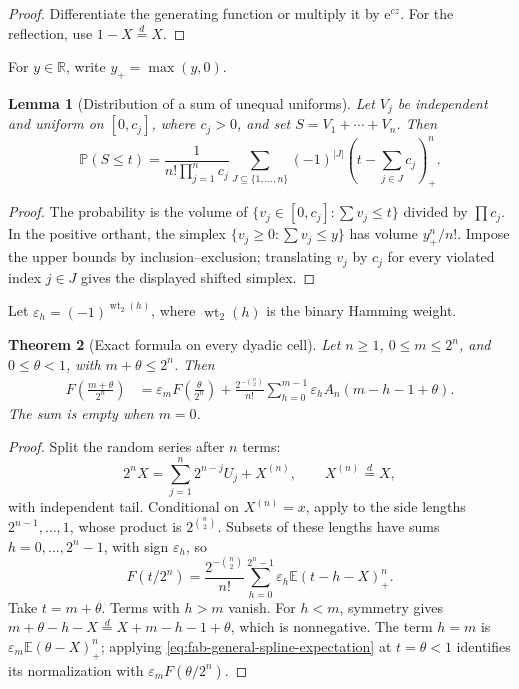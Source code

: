 \documentclass[11pt,oneside,openany]{book}
\newtheorem{theorem}{Theorem}[chapter]
\newtheorem{lemma}[theorem]{Lemma}
\theoremstyle{definition}
\theoremstyle{remark}
\newcommand{\R}{\mathbb R}
\newcommand{\e}{\mathrm e}
\newcommand{\E}{\mathbb E}
\newcommand{\Prob}{\mathbb P}
\begin{document}
\begin{proof}
Differentiate the generating function or multiply it by $\e^{cz}$.  For the
reflection, use $1-X\overset d=X$.
\end{proof}

For $y\in\R$, write $y_+=\max(y,0)$.

\begin{lemma}[Distribution of a sum of unequal uniforms]
\label{lem:fab-box-spline}
Let $V_j$ be independent and uniform on $[0,c_j]$, where $c_j>0$, and set
$S=V_1+\cdots+V_n$.  Then
\begin{equation}
 \Prob(S\le t)=\frac1{n!\prod_{j=1}^{n}c_j}
 \sum_{J\subseteq\{1,\ldots,n\}}(-1)^{|J|}
 \left(t-\sum_{j\in J}c_j\right)_+^n.
 \label{eq:fab-box-spline}
\end{equation}
\end{lemma}

\begin{proof}
The probability is the volume of
$\{v_j\in[0,c_j]:\sum v_j\le t\}$ divided by $\prod c_j$.  In the positive
orthant, the simplex $\{v_j\ge0:\sum v_j\le y\}$ has volume $y_+^n/n!$.
Impose the upper bounds by inclusion--exclusion; translating $v_j$ by $c_j$
for every violated index $j\in J$ gives the displayed shifted simplex.
\end{proof}

Let $\varepsilon_h=(-1)^{\operatorname{wt}_2(h)}$, where
$\operatorname{wt}_2(h)$ is the binary Hamming weight.

\begin{theorem}[Exact formula on every dyadic cell]
\label{thm:fab-dyadic-cell}
Let $n\ge1$, $0\le m\le2^n$, and $0\le\theta<1$, with
$m+\theta\le2^n$.  Then
\begin{align}
 F\!\left(\frac{m+\theta}{2^n}\right)
 &=\varepsilon_mF\!\left(\frac{\theta}{2^n}\right)
 +\frac{2^{-\binom n2}}{n!}
  \sum_{h=0}^{m-1}\varepsilon_hA_n(m-h-1+\theta).
 \label{eq:fab-dyadic-cell}
\end{align}
The sum is empty when $m=0$.
\end{theorem}

\begin{proof}
Split the random series after $n$ terms:
\[
 2^nX=\sum_{j=1}^{n}2^{n-j}U_j+X^{(n)},
 \qquad X^{(n)}\overset d=X,
\]
with independent tail.  Conditional on $X^{(n)}=x$, apply
 to the side lengths
$2^{n-1},\ldots,1$, whose product is $2^{\binom n2}$.  Subsets of these
lengths have sums $h=0,\ldots,2^n-1$, with sign $\varepsilon_h$, so
\begin{equation}
 F(t/2^n)=\frac{2^{-\binom n2}}{n!}
 \sum_{h=0}^{2^n-1}\varepsilon_h\E(t-h-X)_+^n.
 \label{eq:fab-general-spline-expectation}
\end{equation}
Take $t=m+\theta$.  Terms with $h>m$ vanish.  For $h<m$, symmetry gives
$m+\theta-h-X\overset d=X+m-h-1+\theta$, which is nonnegative.  The term
$h=m$ is $\varepsilon_m\E(\theta-X)_+^n$; applying
\eqref{eq:fab-general-spline-expectation} at $t=\theta<1$ identifies its
normalization with $\varepsilon_mF(\theta/2^n)$.
\end{proof}
\end{document}

